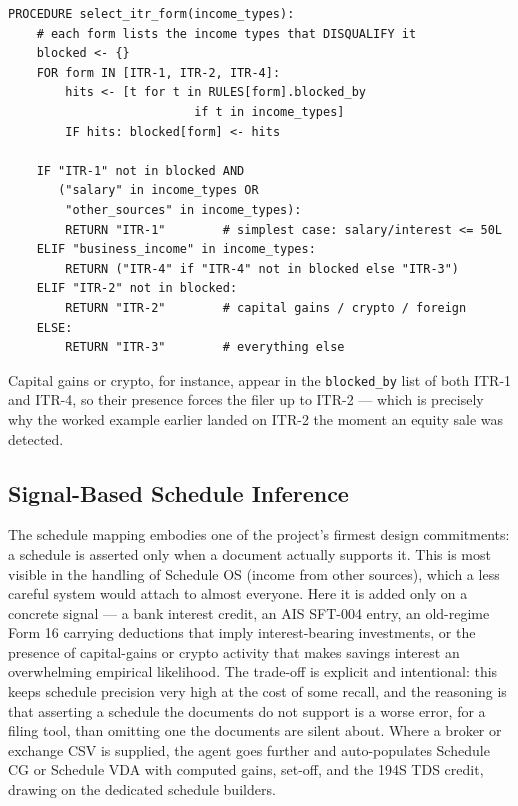 \begin{lstlisting}[style=pseudo]
PROCEDURE select_itr_form(income_types):
    # each form lists the income types that DISQUALIFY it
    blocked <- {}
    FOR form IN [ITR-1, ITR-2, ITR-4]:
        hits <- [t for t in RULES[form].blocked_by
                          if t in income_types]
        IF hits: blocked[form] <- hits

    IF "ITR-1" not in blocked AND
       ("salary" in income_types OR
        "other_sources" in income_types):
        RETURN "ITR-1"        # simplest case: salary/interest <= 50L
    ELIF "business_income" in income_types:
        RETURN ("ITR-4" if "ITR-4" not in blocked else "ITR-3")
    ELIF "ITR-2" not in blocked:
        RETURN "ITR-2"        # capital gains / crypto / foreign
    ELSE:
        RETURN "ITR-3"        # everything else
\end{lstlisting}

Capital gains or crypto, for instance, appear in the \texttt{blocked\_by} list
of both ITR-1 and ITR-4, so their presence forces the filer up to ITR-2 ---
which is precisely why the worked example earlier landed on ITR-2 the moment an
equity sale was detected.

\subsection{Signal-Based Schedule Inference}
The schedule mapping embodies one of the project's firmest design commitments:
a schedule is asserted only when a document actually supports it. This is most
visible in the handling of Schedule OS (income from other sources), which a less
careful system would attach to almost everyone. Here it is added only on a
concrete signal --- a bank interest credit, an AIS SFT-004 entry, an
old-regime Form 16 carrying deductions that imply interest-bearing investments,
or the presence of capital-gains or crypto activity that makes savings interest
an overwhelming empirical likelihood. The trade-off is explicit and intentional:
this keeps schedule precision very high at the cost of some recall, and the
reasoning is that asserting a schedule the documents do not support is a worse
error, for a filing tool, than omitting one the documents are silent about.
Where a broker or exchange CSV is supplied, the agent goes further and
auto-populates Schedule CG or Schedule VDA with computed gains, set-off, and the
194S TDS credit, drawing on the dedicated schedule builders.

